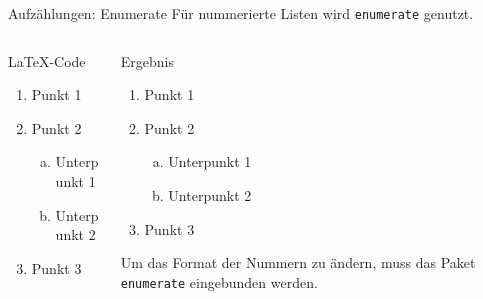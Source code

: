 \begin{frame}[fragile]{Aufzählungen: Enumerate}
  Für nummerierte Listen wird \texttt{enumerate} genutzt.
  \begin{columns}[t]
    \begin{column}{0.47\textwidth}
      \begin{block}{\LaTeX-Code}
        \begin{lstverbatim}
        \begin{enumerate}
          \item Punkt 1
          \item Punkt 2
            \begin{enumerate}[(a)]
              \item Unterpunkt 1
              \item Unterpunkt 2
            \end{enumerate}
          \item Punkt 3
        \end{enumerate}
        \end{lstverbatim}
      \end{block}
    \end{column}
    \begin{column}{0.47\textwidth}
      \begin{block}{Ergebnis}
        \begin{enumerate}
          \item Punkt 1
          \item Punkt 2
            \begin{enumerate}[(a)]
              \item Unterpunkt 1
              \item Unterpunkt 2
            \end{enumerate}
          \item Punkt 3
        \end{enumerate}
      \end{block}
      Um das Format der Nummern zu ändern, muss das Paket \texttt{enumerate} eingebunden werden.
    \end{column}
  \end{columns}
\end{frame}


